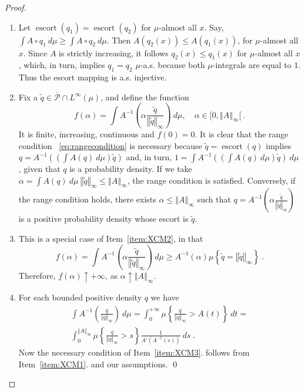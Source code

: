 \documentclass[graybox]{svmult}
\newcommand{\escortof}[1]{\operatorname{escort}\left(#1\right)}
\newcommand{\normat}[2]{\left\Vert#2\right\Vert_{#1}}
\newcommand{\set}[1]{\left\{#1\right\}}
\begin{document}
\begin{proof}
  \begin{enumerate}
  \item
  Let $\escortof{q_1} = \escortof{q_2}$ for $\mu$-almost all $x$. Say, $\int A\circ q_{1}\ d\mu \geq \int A\circ
q_{2}\ d\mu $. Then $A(q_{2}(x))\leq A(q_{1}(x))$, for $\mu$-almost all $x$. Since $A$ is strictly increasing, it follows $q_{2}(x)\leq q_{1}(x)$ for $\mu$-almost all $x$, which, in turn, implies $q_{1}=q_{2}$ $\mu$-a.s. because both $\mu $-integrals are equal to 1. Thus the escort mapping is a.s. injective.
  \item
    Fix a $\widetilde{q}\in \overline{\mathcal P}\cap L^{\infty}(\mu)$, and define the function
\begin{equation*}
  f(\alpha) = \int A^{-1}\left(\alpha \frac{\widetilde q}{\normat \infty {\widetilde q}}\right)\ d\mu, \quad \alpha \in [0,\left\Vert A\right\Vert_{\infty}[ \ .
\end{equation*}
It is finite, increasing, continuous and $f(0)=0$.
It is clear that the range condition ~\eqref{eq:rangecondition} is necessary because $\widetilde q = \escortof q$ implies $q = A^{-1}\left(\left(\int A(q)\ d\mu\right)\widetilde q\right)$ and, in turn, $1 =  \int A^{-1}\left(\left(\int A(q)\ d\mu\right)\widetilde q\right) \ d\mu$, given that $q$ is a probability density. If we take $\alpha = \int A(q)\ d\mu \ \normat \infty {\widetilde q} \le \normat \infty A$, the range condition is satisfied. Conversely, if the range condition holds, there exists $\alpha \le \normat \infty A$ such that $q = A^{-1}\left(\alpha \frac{\widetilde q}{\normat \infty {\widetilde q}}\right)$ is a positive probability density whose escort is $\widetilde q$. 
\item This is a special case of Item~\ref{item:XCM2}, in that
  \begin{equation*}
    f(\alpha)= \int A^{-1}\left(\alpha \frac{\widetilde q}{\normat \infty {\widetilde q}}\right)\ d\mu  \ge A^{-1}(\alpha)\mu\set{\widetilde q = \normat \infty {\widetilde q}} \ .
  \end{equation*}
  Therefore, $ f(\alpha) \uparrow +\infty$, as $\alpha \uparrow \normat \infty {A}$.  
\item For each bounded positive density $q$ we have
\begin{multline*}
 \int A^{-1}\left(\frac{q}{\normat \infty {q}}\right)\ d\mu = \int_0^{+\infty} \mu\set{\frac{q}{\normat \infty {q}} > A(t)} \ dt = \\ \int_0^{\normat \infty A} \mu\set{\frac{q}{\normat \infty {q}} > s} \frac1{A'\left(A^{-1}(s)\right)} \ ds \ . 
\end{multline*}
Now the necessary condition of Item~\ref{item:XCM3}. follows from Item~\ref{item:XCM1}. and our assumptions.
\qed
\end{enumerate}
\end{proof}
\end{document}
